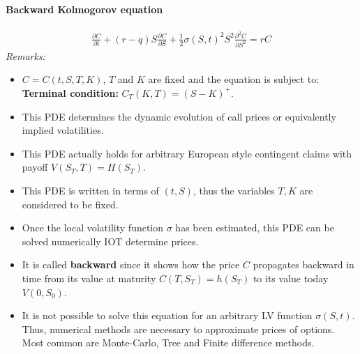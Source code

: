 \documentclass[a4paper,landscape,7pt,fleqn]{scrartcl}
\renewcommand{\emph}[1]{\textbf{#1}}
\begin{document}
\begin{multicols*}{3}
\paragraph{Backward Kolmogorov equation}
\begin{align*}
\frac{\partial C}{\partial t} + (r-q) S \frac{\partial C}{\partial S} + \frac{1}{2} \sigma (S,t)^2 S^2 \frac{\partial^2 C}{\partial S^2} = r C
\end{align*}
\textit{Remarks:}
\begin{itemize}
\item $C = C(t,S,T,K)$, $T$ and $K$ are fixed and the equation is subject to: \\
\emph{Terminal condition:} $C_T(K,T) = (S-K)^+$.
\item This PDE determines the dynamic evolution of call prices or equivalently implied volatilities.
\item This PDE actually holds for arbitrary European style contingent claims with payoff $V(S_T,T) = H(S_T)$.
\item This PDE is written in terms of $(t,S)$, thus the variables $T,K$ are considered to be fixed.
\item Once the local volatility function $\sigma$ has been estimated, this PDE can be solved numerically IOT determine prices.
\item It is called \emph{backward} since it shows how the price $C$ propagates backward in time from its value at maturity $C(T,S_T) = h(S_T)$ to its value today $V(0,S_0)$.
\item It is not possible to solve this equation for an arbitrary LV function $\sigma(S,t)$. \\
Thus, numerical methods are necessary to approximate prices of options. Most common are Monte-Carlo, Tree and Finite difference methods.
\end{itemize}


\end{multicols*}
\end{document}
